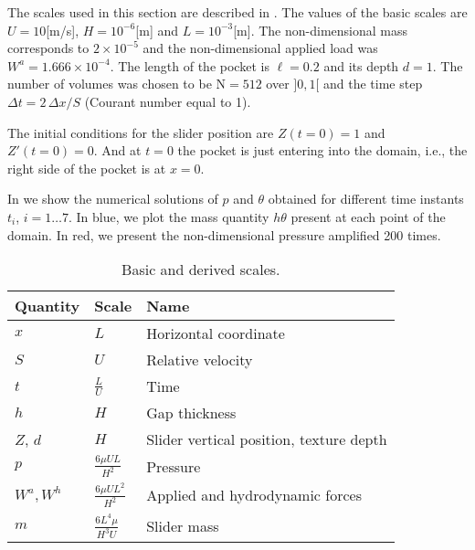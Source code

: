 The scales used in this section are described in . The values of the basic scales are $U=10$[m/s], $H=10^{-6}$[m] and $L=10^{-3}$[m]. The non-dimensional mass corresponds to $2\times 10^{-5}$ and the non-dimensional applied load was $W^a=1.666\times 10^{-4}$. The length of the pocket is $\ell = 0.2$ and its depth $d=1$. The number of volumes was chosen to be N$={}512$ over $]0,1[$ and the time step $\Delta t = 2\,
\Delta x /S$ (Courant number equal to 1).

The initial conditions for the slider position are $Z(t=0)=1$ and $Z'(t=0)=0$. And at $t=0$ the pocket is just entering into the domain, i.e., the right side of the pocket is at $x=0$.

In  we show the numerical solutions of $p$ and $\theta$ obtained for different time instants $t_i$, $i=1\ldots 7$. In blue, we plot the mass quantity $h\theta$ present at each point of the domain. In red, we present the non-dimensional pressure amplified 200 times.
\begin{table}[ht]
\centering
\begin{tabular}{lll}
\toprule
Quantity & Scale & Name\\ \midrule
$x$ & ${L}$ & Horizontal coordinate\\
$S$ & ${U}$ & Relative velocity\\
$t$ & $\frac{L}{U}$ & Time\\
$h$ & $H$ & Gap thickness\\
$Z$, $d$ & $H$ & Slider vertical position, texture depth\\
$p$ & $\frac{6\mu U L}{H^2}$ & Pressure\\
$W^{a}, W^h$ & $\frac{6\mu U L^2}{H^2}$ & Applied and hydrodynamic forces\\
$m$ & $\frac{6 L^4 \mu}{H^3 U}$ & Slider mass \\ \bottomrule
\end{tabular}
\caption[Basic and derived scales for traveling pocket with dynamic behavior of the slider]{Basic and derived scales.}\label{tab:pocket_dynamic_scales}
\end{table}

